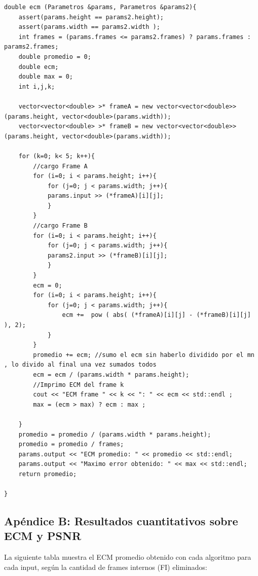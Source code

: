 \lstset{language=C++, breaklines=true, basicstyle=\footnotesize}
\begin{lstlisting}[frame=single]
double ecm (Parametros &params, Parametros &params2){
	assert(params.height == params2.height);
	assert(params.width == params2.width );
	int frames = (params.frames <= params2.frames) ? params.frames : params2.frames;
	double promedio = 0;
	double ecm;
	double max = 0;
	int i,j,k;
	
	vector<vector<double> >* frameA = new vector<vector<double>>(params.height, vector<double>(params.width));
	vector<vector<double> >* frameB = new vector<vector<double>>(params.height, vector<double>(params.width));

	for (k=0; k< 5; k++){
		//cargo Frame A
		for (i=0; i < params.height; i++){
			for (j=0; j < params.width; j++){
			params.input >> (*frameA)[i][j];
			}
		}
		//cargo Frame B
		for (i=0; i < params.height; i++){
			for (j=0; j < params.width; j++){
			params2.input >> (*frameB)[i][j];
			}
		}
		ecm = 0;
		for (i=0; i < params.height; i++){
			for (j=0; j < params.width; j++){
				ecm +=  pow ( abs( (*frameA)[i][j] - (*frameB)[i][j] ), 2);
			}
		}
		promedio += ecm; //sumo el ecm sin haberlo dividido por el mn , lo divido al final una vez sumados todos
		ecm = ecm / (params.width * params.height);
		//Imprimo ECM del frame k
		cout << "ECM frame " << k << ": " << ecm << std::endl ;
  		max = (ecm > max) ? ecm : max ;
		
	}
	promedio = promedio / (params.width * params.height);
	promedio = promedio / frames;
	params.output << "ECM promedio: " << promedio << std::endl;
	params.output << "Maximo error obtenido: " << max << std::endl;
	return promedio;

}
\end{lstlisting}

\newpage

\subsection{Apéndice B: Resultados cuantitativos sobre ECM y PSNR} \label{cuant}

La siguiente tabla muestra el ECM promedio obtenido con cada algoritmo para cada input, según la cantidad de frames internos (FI) eliminados: 

